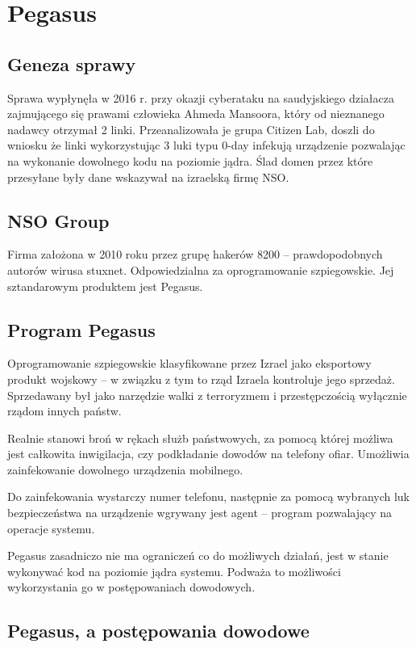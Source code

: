 \documentclass{article}
\begin{document}
\section{Pegasus}

\subsection{Geneza sprawy}

Sprawa wypłynęła w 2016 r. przy okazji cyberataku na saudyjskiego działacza zajmującego się prawami człowieka Ahmeda Mansoora, który od nieznanego nadawcy otrzymał 2 linki. Przeanalizowała je grupa Citizen Lab, doszli do wniosku że linki wykorzystując 3 luki typu 0-day infekują urządzenie pozwalając na wykonanie dowolnego kodu na poziomie jądra. Ślad domen przez które przesyłane były dane wskazywał na izraelską firmę NSO.

\subsection{NSO Group}

Firma założona w 2010 roku przez grupę hakerów 8200 -- prawdopodobnych autorów wirusa stuxnet. Odpowiedzialna za oprogramowanie szpiegowskie. Jej sztandarowym produktem jest Pegasus.

\subsection{Program Pegasus}

Oprogramowanie szpiegowskie klasyfikowane przez Izrael jako eksportowy produkt wojskowy -- w związku z tym to rząd Izraela kontroluje jego sprzedaż. Sprzedawany był jako narzędzie walki z terroryzmem i przestępczością wyłącznie rządom innych państw.

Realnie stanowi broń w rękach służb państwowych, za pomocą której możliwa jest całkowita inwigilacja, czy podkładanie dowodów na telefony ofiar.
Umożliwia zainfekowanie dowolnego urządzenia mobilnego.

Do zainfekowania wystarczy numer telefonu, następnie za pomocą wybranych luk bezpieczeństwa na urządzenie wgrywany jest agent -- program pozwalający na operacje systemu.

Pegasus zasadniczo nie ma ograniczeń co do możliwych działań, jest w stanie wykonywać kod na poziomie jądra systemu. Podważa to możliwości wykorzystania go w postępowaniach dowodowych.

\subsection{Pegasus, a postępowania dowodowe}
\end{document}
